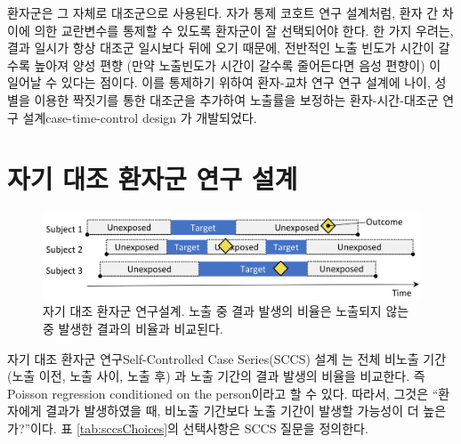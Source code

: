 \documentclass[10.5pt]{book}
\theoremstyle{definition}
\theoremstyle{definition}
\theoremstyle{definition}
\theoremstyle{remark}
\begin{document}
환자군은 그 자체로 대조군으로 사용된다. 자가 통제 코호트 연구 설계처럼,
환자 간 차이에 의한 교란변수를 통제할 수 있도록 환자군이 잘 선택되어야
한다. 한 가지 우려는, 결과 일시가 항상 대조군 일시보다 뒤에 오기 때문에,
전반적인 노출 빈도가 시간이 갈수록 높아져 양성 편향 (만약 노출빈도가
시간이 갈수록 줄어든다면 음성 편향이) 이 일어날 수 있다는 점이다. 이를
통제하기 위하여 환자-교차 연구 연구 설계에 나이, 성별을 이용한 짝짓기를
통한 대조군을 추가하여 노출률을 보정하는 환자-시간-대조군 연구
설계case-time-control design \citep{suissa_1995}가 개발되었다.

\section{자기 대조 환자군 연구 설계}\label{----}


\begin{figure}[h]

{\centering \includegraphics[width=0.9\linewidth]{images/PopulationLevelEstimation/selfControlledCaseSeries} 

}

\caption{자기 대조 환자군 연구설계. 노출 중 결과 발생의 비율은 노출되지 않는 중 발생한 결과의 비율과 비교된다.}\label{fig:selfControlledCaseSeries}
\end{figure}

자기 대조 환자군 연구Self-Controlled Case Series(SCCS) 설계
\citep{farrington_1995, whitaker_2006}는 전체 비노출 기간 (노출 이전,
노출 사이, 노출 후) 과 노출 기간의 결과 발생의 비율을 비교한다. 즉
Poisson regression conditioned on the person이라고 할 수 있다. 따라서,
그것은 ``환자에게 결과가 발생하였을 때, 비노출 기간보다 노출 기간이
발생할 가능성이 더 높은가?''이다. 표 \ref{tab:sccsChoices}의 선택사항은
SCCS 질문을 정의한다. 
\end{document}
